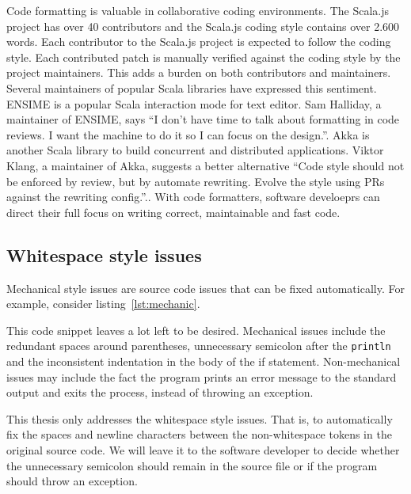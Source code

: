 Code formatting is valuable in collaborative coding environments.
The Scala.js project\autocite{_scala.js_????} has over 40 contributors and the Scala.js coding style\autocite{doeraene_scala.js_2015} contains over 2.600 words.
Each contributor to the Scala.js project is expected to follow the coding style.
Each contributed patch is manually verified against the coding style by the project maintainers.
This adds a burden on both contributors and maintainers.
Several maintainers of popular Scala libraries have expressed this sentiment.
ENSIME\autocite{_ensime_????} is a popular Scala interaction mode for text editor.
Sam Halliday, a maintainer of ENSIME, says ``I don't have time to talk about formatting in code reviews. I want the machine to do it so I can focus on the design.''\autocite{halliday_i_2016-1}.
Akka\autocite{_akka_????} is another Scala library to build concurrent and distributed applications.
Viktor Klang, a maintainer of Akka, suggests a better alternative ``Code style should not be enforced by review, but by automate rewriting. Evolve the style using PRs against the rewriting config.''.\autocite{klang_code_2016}.
With code formatters, software develoeprs can direct their full focus on writing correct, maintainable and fast code.

\subsection{Whitespace style issues}
Mechanical style issues are source code issues that can be fixed automatically.
For example, consider listing~\ref{lst:mechanic}.

This code snippet leaves a lot left to be desired.
Mechanical issues include the redundant spaces around parentheses, unnecessary semicolon after the \texttt{println} and the inconsistent indentation in the body of the if statement.
Non-mechanical issues may include the fact the program prints an error message to the standard output and exits the process, instead of throwing an exception.

This thesis only addresses the whitespace style issues.
That is, to automatically fix the spaces and newline characters between the non-whitespace tokens in the original source code.
We will leave it to the software developer to decide whether the unnecessary semicolon should remain in the source file or if the program should throw an exception.



